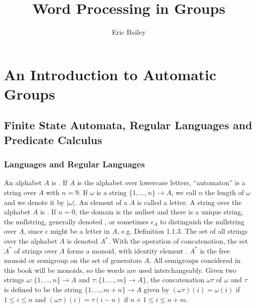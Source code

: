 \documentclass[12pt]{amsbook}
\title{Word Processing in Groups}
\author{Eric Bailey}
\begin{document}
\maketitle
\tableofcontents

\newpage
\part{An Introduction to Automatic Groups}

\chapter{Finite State Automata, Regular Languages and Predicate Calculus}

\section{Languages and Regular Languages}

\begin{outline}
  \1 An \gls{alphabet} $A$ is .
  \2 If $A$ is the \gls{alphabet} over lowercase letters, ``automaton'' is a
  \gls{string} over $A$ with $n = 9$.
  \2 If $\omega$ is a \gls{string} $\{1,...,n\} \to A$, we call $n$ the
  \gls{length} of $\omega$ and we denote it by $|\omega|$.
  \1 An element of a $A$ is called a \gls{letter}.
  \1 A \gls{string} over the \gls{alphabet} $A$ is .
  \1 If $n = 0$, the domain is the nullset and there is a unique string, the
    \gls{nullstring}, generally denoted , or
    sometimes $\epsilon_A$ to distinguish the \gls{nullstring} over $A$, since
    $\epsilon$ might be a \gls{letter} in $A$, e.g. Definition 1.1.3.
  \1 The set of all \glspl{string} over the \gls{alphabet} $A$ is denoted
  $A^*$.
  \2 With the operation of \gls{concatenation}, the set $A^*$ of \glspl{string}
  over $A$ forms a \gls{monoid}, with \gls{identity element}
  .
  \2 $A^*$ is the free monoid or \gls{semigroup} on the set of generators $A$.
  \1 All \glspl{semigroup} considered in this book will be \glspl{monoid}, so
  the words are used interchangeably.
  \1 Given two \glspl{string} $\omega : \{1,...,n\} \to A$ and $\tau :
  \{1,...,m\} \to A\}$, the \gls{concatenation} $\omega\tau$ of $\omega$ and
  $\tau$ is defined to be the \gls{string} $\{1,...,m+n\} \to A$ given by
  $(\omega\tau)(i) = \omega(i)$ if $1 \leq i \leq n$ and $(\omega\tau)(i) =
  \tau(i-n)$ if $n + 1 \leq i \leq n + m$.
\end{outline}

\newpage
\printglossaries
\end{document}
